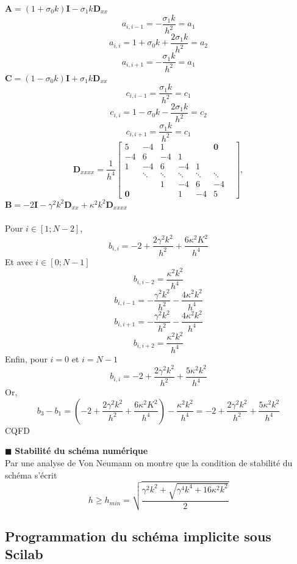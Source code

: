 \documentclass[a4,12pt]{article}
\newcommand{\A}{\mathbf{A}}
\newcommand{\B}{\mathbf{B}}
\newcommand{\C}{\mathbf{C}}
\newcommand{\D}{\mathbf{D}}
\begin{document}
\newpage
\begin{mdframed}[style=exempledefault,backgroundcolor=green!60]
    $\A=(1+\sigma_0 k)\mathbf{I}-\sigma_1 k \D_{xx}$
\[
    a_{i,i-1}=-\frac{\sigma_{1} k}{h^2}=a_{1}
\]
\[
    a_{i,i}=1+\sigma_{0}k+\frac{2\sigma_{1}k}{h^2}=a_{2}
\]
\[
    a_{i,i+1}=-\frac{\sigma_{1} k}{h^2}=a_{1}
\]
    $\C=(1-\sigma_0 k)\mathbf{I}+\sigma_1 k \D_{xx}$
\[
    c_{i,i-1}=\frac{\sigma_{1} k}{h^2}=c_{1}
\]
\[
    c_{i,i}=1-\sigma_{0}k-\frac{2\sigma_{1}k}{h^2}=c_{2}
\]
\[
    c_{i,i+1}=\frac{\sigma_{1} k}{h^2}=c_{1}
\]
\[
\D_{xxxx}=\frac{1}{h^4}
\begin{bmatrix}
    5 & -4 & 1 & & & \mathbf{0} \\
    -4 & 6 & -4 & 1 & & & \\
    1 & -4 & 6 & -4 & 1 & & \\ 
    &\ddots&\ddots&\ddots&\ddots&\ddots\\
    & & 1 & -4 & 6 & -4 \\
    \mathbf{0} & & & 1 & -4 & 5
\end{bmatrix}, 
\]
$\B=-2\mathbf{I}-\gamma^2 k^2 \D_{xx}+\kappa^2 k^2\D_{xxxx}$\\
\\Pour $i \in [1;N-2]$,
\[
    b_{i,i}=-2+\frac{2\gamma ^2 k^2}{h^2}+\frac{6\kappa^2 K^2}{h^4}
\]
Et avec $i \in [0;N-1]$
\[
    b_{i,i-2}=\frac{\kappa^2 k^2}{h^4}
\]
\[
    b_{i,i-1}=-\frac{\gamma^2 k^2}{h^2}-\frac{4\kappa^2 k^2}{h^4}
\]
\[
    b_{i,i+1}=-\frac{\gamma^2 k^2}{h^2}-\frac{4\kappa^2 k^2}{h^4}
\]
\[
    b_{i,i+2}=\frac{\kappa^2 k^2}{h^4}
\]
Enfin, pour $i=0$ et $i=N-1$
\[
    b_{i,i}=-2+\frac{2\gamma^2 k^2}{h^2}+\frac{5\kappa^2 k^2}{h^4}
\]
Or,
\[
    b_{3}-b_{1}=(-2+\frac{2\gamma ^2 k^2}{h^2}+\frac{6\kappa^2 K^2}{h^4})-\frac{\kappa^2 k^2}{h^4}=-2+\frac{2\gamma^2 k^2}{h^2}+\frac{5\kappa^2 k^2}{h^4}
\]
\Large{CQFD}\\
\end{mdframed}

\hspace{0.5cm} $\blacksquare$ \textbf{Stabilité du schéma numérique} \\

Par une analyse de Von Neumann on montre que la condition de stabilité du schéma s'écrit 
\[
h\geqslant h_{min}=\sqrt{\frac{\gamma^2k^2+\sqrt{\gamma^4 k^4+16\kappa^2 k^2}}{2}}
\]

\subsection{Programmation du schéma implicite sous Scilab}
\end{document}
